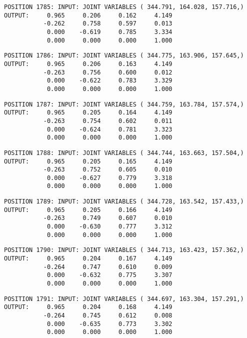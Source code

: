 \begin{verbatim}
POSITION 1785: INPUT: JOINT VARIABLES ( 344.791, 164.028, 157.716,)
OUTPUT:     0.965     0.206     0.162     4.149
           -0.262     0.758     0.597     0.013
            0.000    -0.619     0.785     3.334
            0.000     0.000     0.000     1.000
\end{verbatim} \pagebreak[1]\begin{verbatim}
POSITION 1786: INPUT: JOINT VARIABLES ( 344.775, 163.906, 157.645,)
OUTPUT:     0.965     0.206     0.163     4.149
           -0.263     0.756     0.600     0.012
            0.000    -0.622     0.783     3.329
            0.000     0.000     0.000     1.000
\end{verbatim} \pagebreak[1]\begin{verbatim}
POSITION 1787: INPUT: JOINT VARIABLES ( 344.759, 163.784, 157.574,)
OUTPUT:     0.965     0.205     0.164     4.149
           -0.263     0.754     0.602     0.011
            0.000    -0.624     0.781     3.323
            0.000     0.000     0.000     1.000
\end{verbatim} \pagebreak[1]\begin{verbatim}
POSITION 1788: INPUT: JOINT VARIABLES ( 344.744, 163.663, 157.504,)
OUTPUT:     0.965     0.205     0.165     4.149
           -0.263     0.752     0.605     0.010
            0.000    -0.627     0.779     3.318
            0.000     0.000     0.000     1.000
\end{verbatim} \pagebreak[1]\begin{verbatim}
POSITION 1789: INPUT: JOINT VARIABLES ( 344.728, 163.542, 157.433,)
OUTPUT:     0.965     0.205     0.166     4.149
           -0.263     0.749     0.607     0.010
            0.000    -0.630     0.777     3.312
            0.000     0.000     0.000     1.000
\end{verbatim} \pagebreak[1]\begin{verbatim}
POSITION 1790: INPUT: JOINT VARIABLES ( 344.713, 163.423, 157.362,)
OUTPUT:     0.965     0.204     0.167     4.149
           -0.264     0.747     0.610     0.009
            0.000    -0.632     0.775     3.307
            0.000     0.000     0.000     1.000
\end{verbatim} \pagebreak[1]\begin{verbatim}
POSITION 1791: INPUT: JOINT VARIABLES ( 344.697, 163.304, 157.291,)
OUTPUT:     0.965     0.204     0.168     4.149
           -0.264     0.745     0.612     0.008
            0.000    -0.635     0.773     3.302
            0.000     0.000     0.000     1.000
\end{verbatim} \pagebreak[1]\begin{verbatim}

\end{verbatim}

